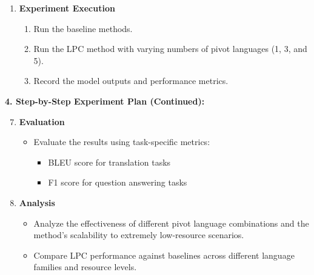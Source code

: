 \begin{tcolorbox}[colback=blue!5!white,colframe=blue!75!black,title=\textbf{Linguistic Pivot Constellation (LPC): Enhancing Cross-Lingual Transfer for Low-Resource Languages and Dialects (Part 1)}]
\begin{enumerate}
\begin{itemize}
        \end{itemize}
        \item \textbf{Experiment Execution}
        \begin{enumerate}
            \item Run the baseline methods.
            \item Run the LPC method with varying numbers of pivot languages (1, 3, and 5).
            \item Record the model outputs and performance metrics.
        \end{enumerate}
    \end{enumerate}
\end{tcolorbox}

\newpage 

\begin{tcolorbox}[colback=blue!5!white,colframe=blue!75!black,title=\textbf{Linguistic Pivot Constellation (LPC): Enhancing Cross-Lingual Transfer for Low-Resource Languages and Dialects (Part 3)}]
\small 
\textbf{4. Step-by-Step Experiment Plan (Continued):}
    \begin{enumerate}
    \setcounter{enumi}{6} 
        \item \textbf{Evaluation}
        \begin{itemize}
            \item Evaluate the results using task-specific metrics:
            \begin{itemize}
                \item BLEU score for translation tasks
                \item F1 score for question answering tasks
            \end{itemize}
        \end{itemize}
        \item \textbf{Analysis}
        \begin{itemize}
            \item Analyze the effectiveness of different pivot language combinations and the method's scalability to extremely low-resource scenarios.
            \item Compare LPC performance against baselines across different language families and resource levels.
        \end{itemize}
    \end{enumerate}
    


\end{tcolorbox}

